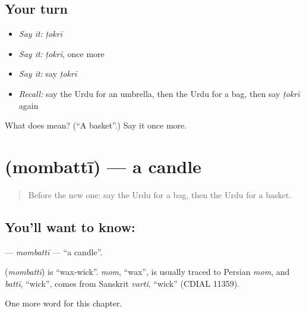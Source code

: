 \subsection*{Your turn}
\begin{itemize}
\raggedright
  \item \emph{Say it:} \emph{ṭokrī}
  \item \emph{Say it:} \emph{ṭokrī}, once more
  \item \emph{Say it:} say \emph{ṭokrī}
  \item \emph{Recall:} say the Urdu for an umbrella, then the Urdu for a bag, then say \emph{ṭokrī} again
\end{itemize}

\begin{tcolorbox}[breakable,colback=teal!4,colframe=teal!35!black,title={Before you move on}]
What does  mean? (\textquotedblleft{}A basket\textquotedblright{}.) Say it once more.
\end{tcolorbox}
\section[\texorpdfstring{\ur{موم} \ur{بتی} (mombattī)}{موم بتی (mombattī)}]{  (mombattī) — a candle}

\label{lesson:UR-C111-mombatti}



\begin{quote}
Before the new one: say the Urdu for a bag, then the Urdu for a basket.
\end{quote}

\subsection*{You'll want to know:  }
\textbf{ } — \emph{mombattī} — \textquotedblleft{}a candle\textquotedblright{}.

\begin{cousinweb}
\textbf{ } (\emph{mombattī}) is \textquotedblleft{}wax-wick\textquotedblright{}. \emph{mom}, \textquotedblleft{}wax\textquotedblright{}, is usually traced to Persian \emph{mom}, and \emph{battī}, \textquotedblleft{}wick\textquotedblright{}, comes from Sanskrit \emph{varti}, \textquotedblleft{}wick\textquotedblright{} (CDIAL 11359).
\end{cousinweb}

\begin{grammarlens}[title={What you've built}]
One more word for this chapter.
\end{grammarlens}

